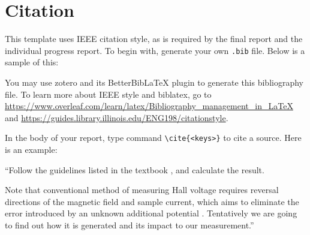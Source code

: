 \chapter{Citation}
This template uses IEEE citation style, as is required by the final report and the individual progress report. To begin with, generate your own \verb|.bib| file. Below is a sample of this:



You may use zotero and its BetterBibLaTeX plugin to generate this bibliography file. To learn more about IEEE style and biblatex, go to \url{https://www.overleaf.com/learn/latex/Bibliography_management_in_LaTeX} and \url{https://guides.library.illinois.edu/ENG198/citationstyle}.

In the body of your report, type command \verb|\cite{<keys>}| to cite a source. Here is an example:

  ``Follow the guidelines listed in the textbook \cite[pp. 129-130]{streetman2015}, and calculate the result.

  Note that conventional method of measuring Hall voltage requires reversal directions of the magnetic field and sample current, which aims to eliminate the error introduced by an unknown additional potential \cite{li2023}. Tentatively we are going to find out how it is generated and its impact to our measurement.''

